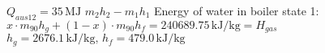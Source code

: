 \( Q_{aus12} = 35 \, \text{MJ} \)  
\( m_{2} h_{2} - m_{1} h_{1} \)  
Energy of water in boiler state 1:  
\( x \cdot m_{90} h_g + (1 - x) \cdot m_{90} h_f = 240689.75 \, \text{kJ/kg} = H_{gas} \)  
\( h_g = 2676.1 \, \text{kJ/kg}, \, h_f = 479.0 \, \text{kJ/kg} \)